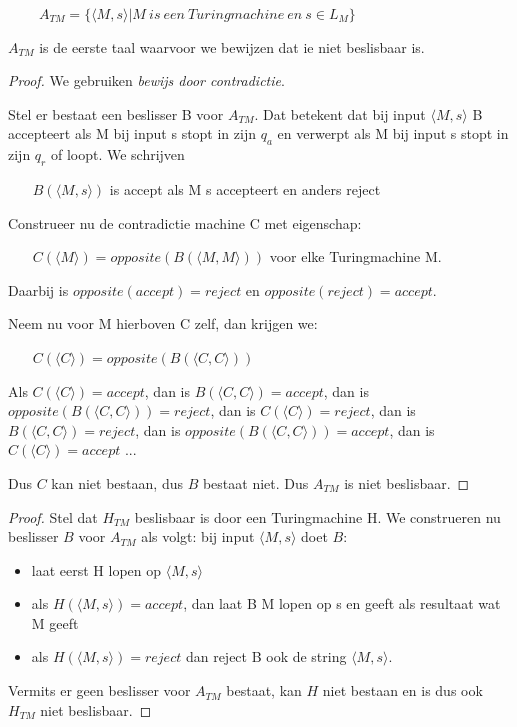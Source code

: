 $~~~~~~~~~~A_{TM} = \{\langle M,s \rangle| M~is~een~Turingmachine~en~s \in L_{M}\}$ 

$A_{TM}$ is de eerste taal waarvoor we bewijzen dat ie niet beslisbaar is.
\begin{proof}
We gebruiken {\em bewijs door contradictie}.


Stel er bestaat een beslisser B voor $A_{TM}$. Dat betekent dat bij
input $\langle M,s \rangle$ B accepteert als M bij input s stopt in zijn $q_a$ en
verwerpt als M bij input s stopt in zijn $q_r$ of loopt. We schrijven

$~~~~~~~~B(\langle M,s \rangle)$ is accept als M s accepteert en anders reject


Construeer nu de contradictie machine C met eigenschap:

$~~~~~~~~C(\langle M \rangle) = opposite(B(\langle M,M \rangle))$ voor elke Turingmachine M.

Daarbij is
$opposite(accept) = reject$ en $opposite(reject) = accept$.


Neem nu voor M hierboven C zelf, dan krijgen we:

$~~~~~~~~C(\langle C \rangle) = opposite(B(\langle C,C \rangle))$


Als $C(\langle C \rangle) = accept$, dan is $B(\langle C,C \rangle) = accept$, 
% 
dan is $opposite(B(\langle C,C \rangle)) = reject$, dan is $C(\langle C \rangle) = reject$,
%
dan is $B(\langle C,C \rangle) = reject$, dan is  $opposite(B(\langle C,C \rangle)) = accept$, dan is
%
$C(\langle C \rangle) = accept$ ...


Dus $C$ kan niet bestaan, dus $B$ bestaat niet. Dus $A_{TM}$ is niet
beslisbaar.
\end{proof}

\begin{proof}
Stel dat $H_{TM}$ beslisbaar is door een Turingmachine H. We
construeren nu beslisser $B$ voor $A_{TM}$ als volgt: bij
input $\langle M,s \rangle$ doet $B$:
\begin{itemize}
\item laat eerst H lopen op $\langle M,s \rangle$
\item als $H(\langle M,s \rangle) = accept$, dan laat B M lopen op s en geeft als
resultaat wat M geeft
\item als $H(\langle M,s \rangle) = reject$ dan reject B ook de string $\langle M,s \rangle$.
\end{itemize}
Vermits er geen beslisser voor $A_{TM}$ bestaat, kan $H$ niet bestaan
en is dus ook $H_{TM}$ niet beslisbaar. \end{proof}

